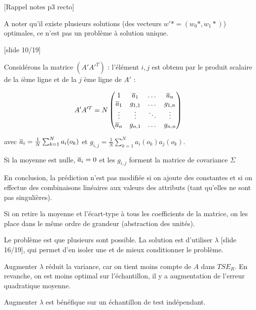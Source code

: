 		[Rappel notes p3 recto]
		
		A noter qu'il existe plusieurs solutions (des vecteurs $w'* = (w_0*, w_1*)$) optimales, ce n'est pas un problème à solution unique.
		
		[slide 10/19]
		
		Considérons la matrice $(A'A'^T)$ : l'élément $i, j$ est obtenu par le produit scalaire de la $i$ème ligne et de la $j$ ème ligne de $A'$ :
		
		$$A'A'^T = N \begin{pmatrix}
		1 &  \overline{a}_1 & \dots & \overline{a}_n \\ 
		\overline{a}_1 & g_{1,1} & \dots & g_{1, n} \\
		\vdots & \vdots & \ddots & \vdots \\
		\overline{a}_n & g_{n, 1} & \dots & g_{n, n}
		\end{pmatrix} $$
		
		avec $\overline{a}_i = \frac{1}{N} \sum_{k = 1}^N a_i(o_k)$ et $g_{i, j} = \frac{1}{N} \sum_{k = 1}^N a_i(o_k)a_j(o_k)$.
		
		Si la moyenne est nulle, $\overline{a}_i = 0$ et les $g_{i, j}$ forment la matrice de covariance $\Sigma$
		
		
		En conclusion, la prédiction n'est pas modifiée si on ajoute des constantes et si on effectue des combinaisons linéaires aux valeurs des attributs (tant qu'elles ne sont pas singulières).
		
		Si on retire la moyenne et l'écart-type à tous les coefficients de la matrice, on les place dans le même ordre de grandeur (abstraction des unités).
		
		
		Le problème est que plusieurs sont possible. La solution est d'utiliser $\lambda$ [slide 16/19], qui permet d'en isoler une et de mieux conditionner le problème.
		
		Augmenter $\lambda$ réduit la variance, car on tient moins compte de $A$ dans $TSE_R$. En revanche, on est moins optimal sur l'échantillon, il y a augmentation de l'erreur quadratique moyenne.
		
		
		Augmenter $\lambda$ est bénéfique sur un échantillon de test indépendant.
		
